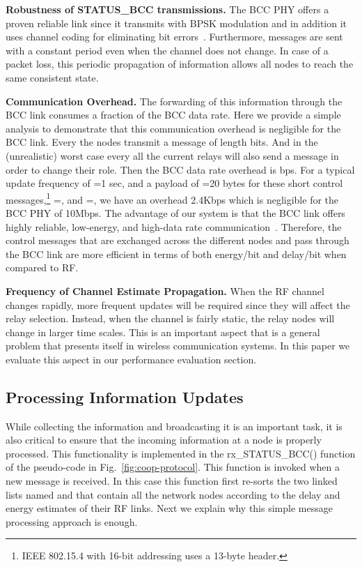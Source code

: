 \documentclass[10pt]{IEEEtran}
\newcounter{section:outage-analysis}
\begin{document}
\textbf{Robustness of STATUS\_BCC transmissions.}
The BCC PHY offers a proven reliable link since it transmits with BPSK modulation and in addition it uses channel coding for eliminating bit errors~\cite{fazzi09}. Furthermore,  messages are sent with a constant period  even when the channel does not change. In case of a packet loss, this periodic propagation of information allows all nodes to reach the same consistent state.

\textbf{Communication Overhead.} The forwarding of this information through the BCC link consumes a fraction of the BCC data rate. Here we provide a simple analysis to demonstrate that this communication overhead is negligible for the BCC link. Every  the  nodes transmit a  message of length  bits. And in the (unrealistic) worst case every  all the current  relays will also send a message  in order to change their role. Then the BCC data rate overhead is  bps. For a typical update frequency of =1 sec, and a payload of =20 bytes for these short control messages,\footnote{IEEE 802.15.4 with 16-bit addressing uses a 13-byte header.} =, and =, we have an overhead 2.4Kbps which is negligible for the BCC PHY of 10Mbps. The advantage of our system is that the BCC link offers highly reliable, low-energy, and high-data rate communication~\cite{baldus09,schenk08}. Therefore, the control messages that are exchanged across the different nodes and pass through the BCC link are more efficient in terms of both energy/bit and delay/bit when compared to RF.

\textbf{Frequency of Channel Estimate Propagation.} When the RF channel changes rapidly, more frequent updates will be required since they will affect the relay selection. Instead, when the channel is fairly static, the relay nodes will change in larger time scales. This is an important aspect that is a general problem that presents itself in wireless communication systems. In this paper we evaluate this aspect in our performance evaluation section.


\subsection{Processing Information Updates}
\label{subsection:2}
While collecting the information and broadcasting it is an important task, it is also critical to ensure that the incoming information at a node is properly processed. This functionality is implemented in the rx\_STATUS\_BCC() function of the pseudo-code in Fig.~\ref{fig:coop-protocol}. This function is invoked when a new  message is received. In this case this function first re-sorts the two linked lists named  and  that contain all the  network nodes according to the delay and energy estimates of their RF links. Next we explain why this simple message processing approach is enough.
\end{document}
